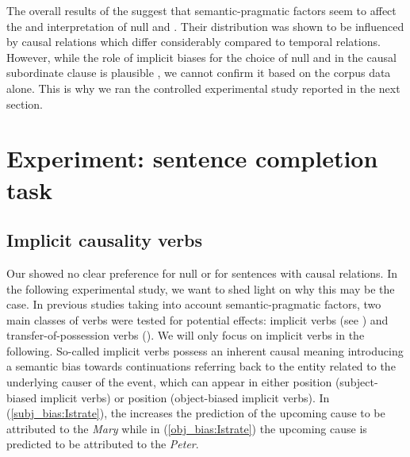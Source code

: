 \documentclass[output=paper,colorlinks,citecolor=brown]{langscibook}
\begin{document}
The overall results of the  suggest that semantic-pragmatic factors seem to affect the  and interpretation of null and . Their distribution was shown to be influenced by causal relations which differ considerably compared to temporal relations. However, while the role of implicit  biases for the choice of null and  in the causal subordinate clause is plausible \citep{mayol2018asymmetries}, we cannot confirm it based on the corpus data alone. This is why we ran the controlled experimental study reported in the next section.

\section{Experiment: sentence completion task}
\label{exp:Istrate}

\subsection{Implicit causality verbs}

Our  showed no clear preference for null or  for sentences with causal relations. In the following experimental study, we want to shed light on why this may be the case. In previous studies taking into account semantic-pragmatic factors, two main classes of verbs were tested for potential  effects: implicit  verbs (see \citealt{caramazza1977comprehension, costa2004semantic, fukumura2010choosing, rohde2014grammatical, holler2016empirical, mayol2018asymmetries, weatherford2021semantic, bott2023production}) and transfer-of-possession verbs (\cite{stevenson1994thematic, rohde2008coherence, vogels2019both, lindemann2020thematic}). We will only focus on implicit  verbs in the following. So-called implicit  verbs possess an inherent causal meaning introducing a semantic bias towards continuations referring back to the entity related to the underlying causer of the event, which can appear in either  position (subject-biased implicit  verbs) or  position (object-biased implicit  verbs). In (\ref{subj_bias:Istrate}), the  increases the prediction of the upcoming cause to be attributed to the  \textit{Mary} while in (\ref{obj_bias:Istrate}) the upcoming cause is predicted to be attributed to the  \textit{Peter}.
\end{document}
